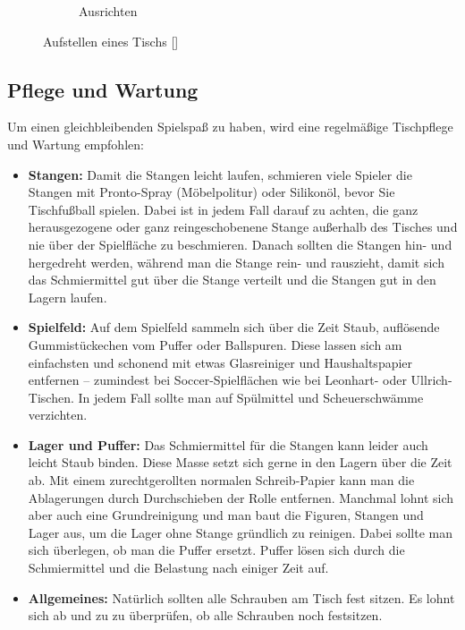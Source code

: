 \begin{figure}
\begin{subfigure}[b]{0.7\textwidth}
\caption{Ausrichten} 
\label{fig:tisch:ausrichten} 
\end{subfigure} 
\label{fig:tisch} 
\caption{Aufstellen eines Tischs [\cite{itsf_basics}]} 
\end{figure}

\subsection{Pflege und Wartung}
\label{tisch:tisch:wartung}

Um einen gleichbleibenden Spielspaß zu haben, wird eine regelmäßige Tischpflege und Wartung empfohlen:
\begin{itemize}  
\item {\bf Stangen:} Damit die Stangen leicht laufen, schmieren viele Spieler die Stangen mit Pronto-Spray (Möbelpolitur) oder Silikonöl, bevor Sie Tischfußball spielen. Dabei ist in jedem Fall darauf zu achten, die ganz herausgezogene oder ganz reingeschobenene Stange außerhalb des Tisches und nie über der Spielfläche zu beschmieren. Danach sollten die Stangen hin- und hergedreht werden, während man die Stange rein- und rauszieht, damit sich das Schmiermittel gut über die Stange verteilt  und die Stangen gut in den Lagern laufen.
\item {\bf Spielfeld:} Auf dem Spielfeld sammeln sich über die Zeit Staub, auflösende Gummistückechen vom Puffer oder Ballspuren. Diese lassen sich am einfachsten und schonend mit etwas Glasreiniger und Haushaltspapier entfernen -- zumindest bei Soccer-Spielflächen wie bei Leonhart- oder Ullrich-Tischen. In jedem Fall sollte man auf Spülmittel und Scheuerschwämme verzichten. 
\item {\bf Lager und Puffer:} Das Schmiermittel für die Stangen kann leider auch leicht Staub binden. Diese Masse setzt sich gerne in den Lagern über die Zeit ab. Mit einem zurechtgerollten normalen Schreib-Papier kann man die Ablagerungen durch Durchschieben der Rolle entfernen. Manchmal lohnt sich aber auch eine Grundreinigung und man baut die Figuren, Stangen und Lager aus, um die Lager ohne Stange gründlich zu reinigen. Dabei sollte man sich überlegen, ob man die Puffer ersetzt. Puffer lösen sich durch die Schmiermittel und die Belastung nach einiger Zeit auf.    
\item {\bf Allgemeines:} Natürlich sollten alle Schrauben am Tisch fest sitzen. Es lohnt sich ab und zu zu überprüfen, ob alle Schrauben noch festsitzen.  
\end{itemize}  


